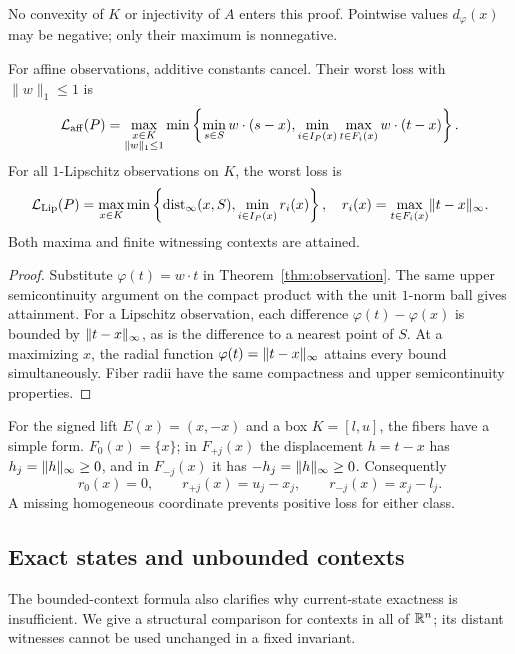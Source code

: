 No convexity of $K$ or injectivity of $A$ enters this proof. Pointwise values $d_\varphi(x)$ may be negative; only their maximum is nonnegative.

\begin{corollary}\label{cor:observations}
For affine observations, additive constants cancel. Their worst loss with $\|w\|_1\le1$ is
\begin{equation}\label{eq:affine-support}
\mathcal L_{\rm aff}(P)=\max_{\substack{x\in K\\\|w\|_1\le1}}
\min\left\{\min_{s\in S}w\cdot(s-x),
   \min_{i\in I_P(x)}\max_{t\in F_i(x)}w\cdot(t-x)\right\}.
\end{equation}
For all $1$-Lipschitz observations on $K$, the worst loss is
\begin{equation}\label{eq:radius}
\mathcal L_{\rm Lip}(P)=\max_{x\in K}
\min\left\{\operatorname{dist}_\infty(x,S),\min_{i\in I_P(x)}r_i(x)\right\},
\quad r_i(x)=\max_{t\in F_i(x)}\lVert t-x\rVert_\infty.
\end{equation}
Both maxima and finite witnessing contexts are attained.
\end{corollary}
\begin{proof}
Substitute $\varphi(t)=w\cdot t$ in Theorem~\ref{thm:observation}. The same upper semicontinuity argument on the compact product with the unit $1$-norm ball gives attainment. For a Lipschitz observation, each difference $\varphi(t)-\varphi(x)$ is bounded by $\lVert t-x\rVert_\infty$, as is the difference to a nearest point of $S$. At a maximizing $x$, the radial function $\varphi(t)=\lVert t-x\rVert_\infty$ attains every bound simultaneously. Fiber radii have the same compactness and upper semicontinuity properties.
\end{proof}

For the signed lift $E(x)=(x,-x)$ and a box $K=[l,u]$, the fibers have a simple form. $F_0(x)=\{x\}$; in $F_{+j}(x)$ the displacement $h=t-x$ has $h_j=\lVert h\rVert_\infty\ge0$, and in $F_{-j}(x)$ it has $-h_j=\lVert h\rVert_\infty\ge0$. Consequently
\begin{equation}\label{eq:signed-radii}
r_0(x)=0,\qquad r_{+j}(x)=u_j-x_j,\qquad r_{-j}(x)=x_j-l_j.
\end{equation}
A missing homogeneous coordinate prevents positive loss for either class.

\subsection{Exact states and unbounded contexts}\label{sec:unbounded}
The bounded-context formula also clarifies why current-state exactness is insufficient. We give a structural comparison for contexts in all of $\mathbb R^n$; its distant witnesses cannot be used unchanged in a fixed invariant.

